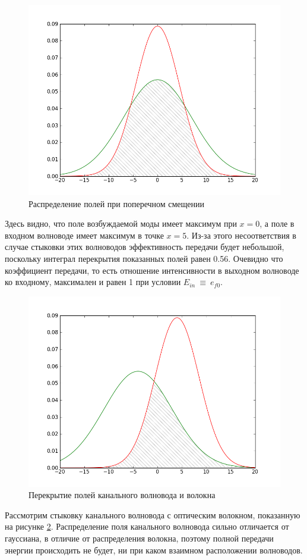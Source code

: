 \begin{figure}[h!]
	\includegraphics[width=.8\textwidth]{img/intersection.png}
	\caption{Распределение полей при поперечном смещении}
	\label{intersection}
\end{figure}

Здесь видно, что поле возбуждаемой моды имеет максимум при $x=0$, а поле в входном волноводе имеет максимум в точке $x=5$. Из-за этого несоответствия в случае стыковки этих волноводов эффективность передачи будет небольшой, поскольку интеграл перекрытия показанных полей равен 0.56. Очевидно что коэффициент передачи, то есть отношение интенсивности в выходном волноводе ко входному, максимален и равен 1 при условии $E_{in}~\equiv~e_{f0}$.
\begin{figure}[h!]
	\includegraphics[width=.8\textwidth]{img/intersection2.png}
	\caption{Перекрытие полей канального волновода и волокна}
	\label{intersection2}	
\end{figure}

Рассмотрим стыковку канального волновода с оптическим волокном, показанную на рисунке \ref{intersection2}. Распределение поля канального волновода сильно отличается от гауссиана, в отличие от распределения волокна, поэтому полной передачи энергии происходить не будет, ни при каком взаимном расположении волноводов.


